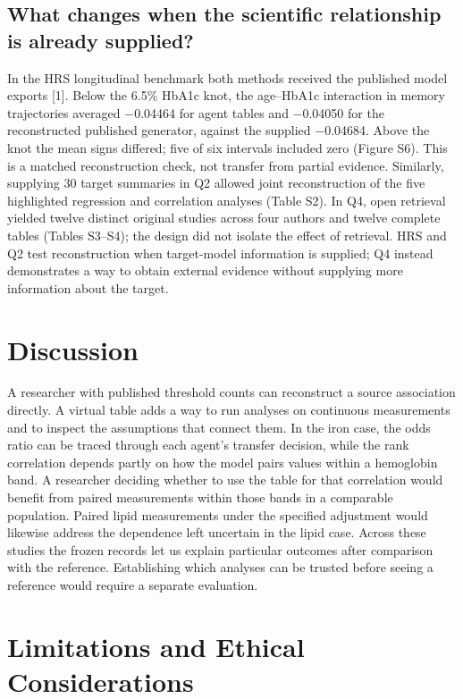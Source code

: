 \documentclass[sigconf,review]{acmart}
\begin{document}
\subsection{What changes when the scientific relationship is already supplied?}

In the HRS longitudinal benchmark both methods received the published model exports [1]. Below the 6.5\% HbA1c knot, the age–\allowbreak{}HbA1c interaction in memory trajectories averaged −0.04464 for agent tables and −0.04050 for the reconstructed published generator, against the supplied −0.04684. Above the knot the mean signs differed; five of six intervals included zero (Figure S6). This is a matched reconstruction check, not transfer from partial evidence. Similarly, supplying 30 target summaries in Q2 allowed joint reconstruction of the five highlighted regression and correlation analyses (Table S2). In Q4, open retrieval yielded twelve distinct original studies across four authors and twelve complete tables (Tables S3–\allowbreak{}S4); the design did not isolate the effect of retrieval. HRS and Q2 test reconstruction when target-model information is supplied; Q4 instead demonstrates a way to obtain external evidence without supplying more information about the target.


\section{Discussion}

A researcher with published threshold counts can reconstruct a source association directly. A virtual table adds a way to run analyses on continuous measurements and to inspect the assumptions that connect them. In the iron case, the odds ratio can be traced through each agent's transfer decision, while the rank correlation depends partly on how the model pairs values within a hemoglobin band. A researcher deciding whether to use the table for that correlation would benefit from paired measurements within those bands in a comparable population. Paired lipid measurements under the specified adjustment would likewise address the dependence left uncertain in the lipid case. Across these studies the frozen records let us explain particular outcomes after comparison with the reference. Establishing which analyses can be trusted before seeing a reference would require a separate evaluation.


\section{Limitations and Ethical Considerations}
\end{document}
